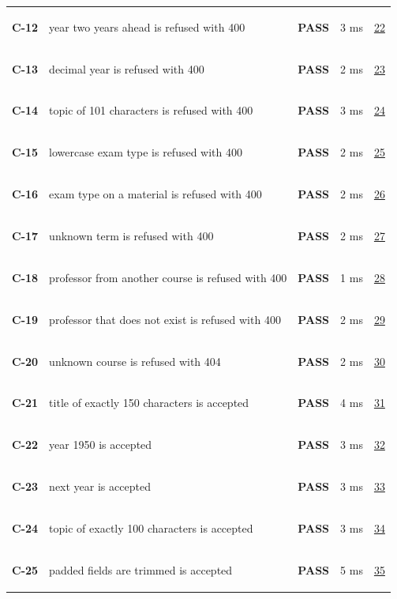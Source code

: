 \documentclass[10pt,a4paper]{article}
\begin{document}
\begin{longtable}{@{}P{1.2cm}P{9.2cm}P{1.2cm}P{1.3cm}P{2.4cm}@{}}
\hypertarget{test-C-12}{\textbf{C-12}} & year two years ahead is refused with 400 & \textcolor{passgreen}{\textbf{PASS}} & 3 ms & \hyperlink{call22}{22} \\
\hypertarget{test-C-13}{\textbf{C-13}} & decimal year is refused with 400 & \textcolor{passgreen}{\textbf{PASS}} & 2 ms & \hyperlink{call23}{23} \\
\hypertarget{test-C-14}{\textbf{C-14}} & topic of 101 characters is refused with 400 & \textcolor{passgreen}{\textbf{PASS}} & 3 ms & \hyperlink{call24}{24} \\
\hypertarget{test-C-15}{\textbf{C-15}} & lowercase exam type is refused with 400 & \textcolor{passgreen}{\textbf{PASS}} & 2 ms & \hyperlink{call25}{25} \\
\hypertarget{test-C-16}{\textbf{C-16}} & exam type on a material is refused with 400 & \textcolor{passgreen}{\textbf{PASS}} & 2 ms & \hyperlink{call26}{26} \\
\hypertarget{test-C-17}{\textbf{C-17}} & unknown term is refused with 400 & \textcolor{passgreen}{\textbf{PASS}} & 2 ms & \hyperlink{call27}{27} \\
\hypertarget{test-C-18}{\textbf{C-18}} & professor from another course is refused with 400 & \textcolor{passgreen}{\textbf{PASS}} & 1 ms & \hyperlink{call28}{28} \\
\hypertarget{test-C-19}{\textbf{C-19}} & professor that does not exist is refused with 400 & \textcolor{passgreen}{\textbf{PASS}} & 2 ms & \hyperlink{call29}{29} \\
\hypertarget{test-C-20}{\textbf{C-20}} & unknown course is refused with 404 & \textcolor{passgreen}{\textbf{PASS}} & 2 ms & \hyperlink{call30}{30} \\
\hypertarget{test-C-21}{\textbf{C-21}} & title of exactly 150 characters is accepted & \textcolor{passgreen}{\textbf{PASS}} & 4 ms & \hyperlink{call31}{31} \\
\hypertarget{test-C-22}{\textbf{C-22}} & year 1950 is accepted & \textcolor{passgreen}{\textbf{PASS}} & 3 ms & \hyperlink{call32}{32} \\
\hypertarget{test-C-23}{\textbf{C-23}} & next year is accepted & \textcolor{passgreen}{\textbf{PASS}} & 3 ms & \hyperlink{call33}{33} \\
\hypertarget{test-C-24}{\textbf{C-24}} & topic of exactly 100 characters is accepted & \textcolor{passgreen}{\textbf{PASS}} & 3 ms & \hyperlink{call34}{34} \\
\hypertarget{test-C-25}{\textbf{C-25}} & padded fields are trimmed is accepted & \textcolor{passgreen}{\textbf{PASS}} & 5 ms & \hyperlink{call35}{35} \\

\end{longtable}
\end{document}
